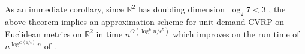 \documentclass[twoside,leqno]{article}
\newcommand{\calT}{{\cal T}}
\newcommand{\opt}{\mbox{\sc opt}}
\newcommand{\OPT}{\mbox{\sc OPT}}
\newcommand{\eps}{\epsilon}
\newcommand{\cost}{\text{cost}}
\DeclarePairedDelimiter\autobracket{(}{)}
\newcommand{\br}[1]{\autobracket*{#1}}
\begin{document}
As an immediate corollary, since $\mathbb{R}^2$ has doubling dimension $\log_2 7 < 3$ \cite{disk-covering}, the above theorem implies an approximation scheme for unit demand CVRP on Euclidean metrics on $\mathbb{R}^2$ in time $n^{O(\log^{6}n/\eps^{5})}$ which improves on the run time of $n^{\log^{O(1/\epsilon)}n}$ of \cite{Das-Mathieu}.
\begin{comment}
\begin{proof}
Let $\OPT_H$ be the optimal solution in the host graph $H$, which is the bounded treewidth graph and let $\OPT_G$ be the optimal solution in the original graph $G$. Let $\opt_G$ and $\opt_H$ denote the cost of the optimal solutions in graph $G$ and $H$. A tour is a set of edges denoting the order in which nodes are visited. Let $\cost_G(\OPT)$ denote the cost of the set of tours in $\OPT$ when used on graph $G$. Our goal is to show that $\cost_G(\OPT_H) \le (1 + \eps)\cost_G(\OPT(G)) \le (1 + \eps)\opt$.



We will use the embedding presented by Lemma \ref{lem:doubling-embed} to embed $G$ into $H$ and use the fact that for any two nodes $u,v$, on expectation
$$d_G(u,v) \le d_H(u,v) \le (1 + \eps) d_G(u,v).$$
Note that the vertices are the same in both $H$ and $G$, so a solution to an instance in $H$ is also a solution in $G$ (and vice versa). Since $d_G(u,v) \le d_H(u,v)$, we know for any solution $\OPT$, $\cost_G(\OPT) \le \cost_H(\OPT)$. Note that $\cost_H(\OPT_H) \le \cost_H(\OPT_G)$.
\begin{equation*}
    \begin{split}
        \cost_G(\OPT_H) & \le \cost_H(\OPT_H) \le \cost_H(\OPT_G) \\
        & = \sum_{\calT_i \in \OPT_G} \cost_H(\calT_i) =\sum_{\calT_i \in \OPT_G}\sum_{uv \in E(\calT_i)} d_H(u,v) \\
        & \le \sum_{\calT_i \in \OPT_G}\sum_{uv \in E(\calT_i)} (1 + \eps) d_G(u,v) \\
        & = (1 + \eps) \sum_{\calT_i \in \OPT_G} \cost_G(\calT_i) \\
        & = (1 + \eps)\cost_G(\OPT_G) \\
    \end{split}
\end{equation*}
Hence, for an appropriate choice of $\eps$, we can find a $(1 + \eps)$-approximation for a graph $G$ which has bounded doubling dimension. Recall that the time complexity of for splittable CVRP on bounded treewidth graphs is $n^{O(k^2 \log^{2c + 3}n/\eps^2)}$. Since the treewidth of $H$, $k \le 2^{O(D)}\br{\frac{4D \log n}{\eps}}^D$, we get that the running time of our algorithm is $n^{O(D^D \log^{2c + D + 3}n/\eps^{D+3})}$.
\end{proof}
\end{comment}
\end{document}
